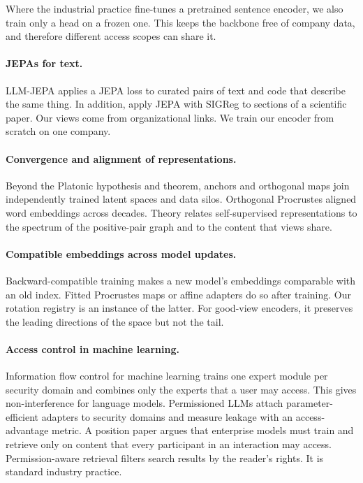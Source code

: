 \documentclass[11pt]{article}
\begin{document}
Where the industrial practice fine-tunes a pretrained sentence encoder\citep{reimers2019sbert}, we also train only a head on a frozen one. This keeps the backbone free of company data, and therefore different access scopes can share it.

\paragraph{JEPAs for text.} LLM-JEPA applies a JEPA loss to curated pairs of text and code that describe the same thing\citep{huang2025llmjepa}. In addition, \citet{zuo2026asymmetric} apply JEPA with SIGReg to sections of a scientific paper. Our views come from organizational links. We train our encoder from scratch on one company.

\paragraph{Convergence and alignment of representations.} Beyond the Platonic hypothesis and theorem\citep{huh2024platonic,balestriero2026platonic}, anchors and orthogonal maps join independently trained latent spaces\citep{moschella2023relative,maiorca2023latent} and data silos\citep{nosaka2024collaboration}. Orthogonal Procrustes aligned word embeddings across decades\citep{hamilton2016diachronic}. Theory relates self-supervised representations to the spectrum of the positive-pair graph\citep{haochen2021spectral} and to the content that views share\citep{vonkugelgen2021content}.

\paragraph{Compatible embeddings across model updates.} Backward-compatible training makes a new model's embeddings comparable with an old index\citep{shen2020bct}. Fitted Procrustes maps or affine adapters do so after training\citep{maystre2025procrustes,vejendla2025drift}. Our rotation registry is an instance of the latter. For good-view encoders, it preserves the leading directions of the space but not the tail.

\paragraph{Access control in machine learning.} Information flow control for machine learning trains one expert module per security domain and combines only the experts that a user may access. This gives non-interference for language models\citep{tiwari2024ifc}. Permissioned LLMs attach parameter-efficient adapters to security domains and measure leakage with an access-advantage metric\citep{jayaraman2025permissioned}. A position paper argues that enterprise models must train and retrieve only on content that every participant in an interaction may access\citep{bhatt2025participant}. Permission-aware retrieval filters search results by the reader's rights. It is standard industry practice.
\end{document}
